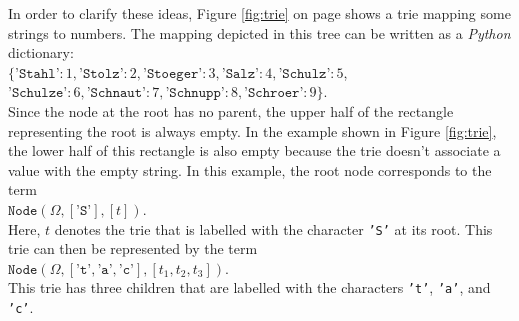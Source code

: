 In order to clarify these ideas, Figure  \ref{fig:trie} on page \pageref{fig:trie} shows a trie
mapping some strings to numbers.  The mapping depicted in this tree can be written as a \textsl{Python}
dictionary: 
\\[0.2cm]
\hspace*{1.3cm} $ \bigl\{ \texttt{'Stahl'}: 1, \texttt{'Stolz'}: 2, \texttt{'Stoeger'}: 3, \texttt{'Salz'}: 4, \texttt{'Schulz'}: 5$, \\[0.2cm]
\hspace*{1.5cm} $         \texttt{'Schulze'}: 6, \texttt{'Schnaut'}: 7, \texttt{'Schnupp'}: 8, \texttt{'Schroer'}: 9\bigr\}$. \\[0.2cm]
Since the node at the root has no parent, the upper half of  the rectangle representing the root is
always empty.  In the example shown in Figure \ref{fig:trie}, the lower half of this rectangle is also empty
because the trie doesn't associate a value with the empty string.  In this example, the root node corresponds
to the term  
\\[0.2cm]
\hspace*{1.3cm}
 $\texttt{Node}(\Omega,[\texttt{'S'}], [t])$. 
\\[0.2cm]
Here,  $t$ denotes the trie that is labelled with the character  \texttt{'S'} at its root.
This trie can then be represented by the term  \\[0.2cm]
\hspace*{1.3cm} 
$\texttt{Node}(\Omega,[\texttt{'t'},\texttt{'a'},\texttt{'c'}], [t_1, t_2, t_3])$. \\[0.2cm]
This trie has three children that are labelled with the characters  \texttt{'t'}, \texttt{'a'}, and \texttt{'c'}.

